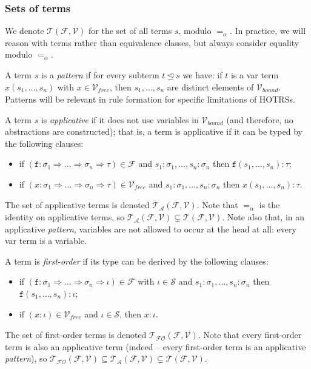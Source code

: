 \documentclass{lmcs}
\theoremstyle{theorem}\newtheorem{theorem}{Theorem}
\theoremstyle{theorem}\newtheorem{lemma}[theorem]{Lemma}
\theoremstyle{theorem}\newtheorem{corollary}[theorem]{Corollary}
\theoremstyle{definition}\newtheorem{definition}[theorem]{Definition}
\theoremstyle{definition}\newtheorem{example}[theorem]{Example}
\newcommand{\F}{\mathcal{F}}
\newcommand{\V}{\mathcal{V}}
\newcommand{\Vfree}{\mathcal{V}_{\mathit{free}}}
\newcommand{\Vbound}{\mathcal{V}_{\mathit{bound}}}
\newcommand{\Sorts}{\mathcal{S}}
\newcommand{\Terms}{\mathcal{T}}
\newcommand{\ATerms}{\mathcal{T}_{\mathcal{A}}}
\newcommand{\FOTerms}{\mathcal{T}_{\mathcal{FO}}}
\newcommand{\asort}{\iota}
\newcommand{\atype}{\sigma}
\newcommand{\btype}{\tau}
\newcommand{\identifier}[1]{\mathtt{#1}}
\newcommand{\afun}{\identifier{f}}
\newcommand{\avar}{x}
\newcommand{\arrtype}{\Rightarrow}
\newcommand{\subtermeq}{\unlhd}
\newcommand{\mysubsection}[1]{\vspace{-12pt}\subsubsection{#1}}
\begin{document}
\mysubsection{Sets of terms}

We denote $\Terms(\F,\V)$ for the set of all terms $s$, modulo $=_\alpha$.  In practice, we will
reason with terms rather than equivalence classes, but always consider equality modulo $=_\alpha$.

A term $s$ is a \emph{pattern} if for every subterm $t \subtermeq s$ we have: if $t$ is a var term
$x(s_1,\dots,s_n)$ with $x \in \Vfree$, then $s_1,\dots,s_n$ are distinct elements of $\Vbound$.
Patterns will be relevant in rule formation for specific limitations of HOTRSs.

A term $s$ is \emph{applicative} if it does not use variables in $\Vbound$ (and therefore, no
abstractions are constructed); that is, a term is applicative if it can be typed by the
following clauses:
\begin{itemize}
\item if $(\afun : \atype_1 \arrtype \dots \arrtype \atype_n \arrtype \btype) \in \F$ and
  $s_1 : \atype_1,\dots,s_n : \atype_n$ then $\afun(s_1,\dots,s_n) : \btype$;
\item if $(\avar : \atype_1 \arrtype \dots \arrtype \atype_n \arrtype \btype) \in \Vfree$ and
  $s_1 : \atype_1,\dots,s_n : \atype_n$ then $\avar(s_1,\dots,s_n) : \btype$.
\end{itemize}
The set of applicative terms is denoted $\ATerms(\F,\V)$.  Note that $=_\alpha$ is the
identity on applicative terms, so $\ATerms(\F,\V) \subsetneq \Terms(\F,\V)$.
Note also that, in an applicative \emph{pattern}, variables are not allowed to occur at the head
at all: every var term is a variable.

A term is \emph{first-order} if its type can be derived by the following clauses:
\begin{itemize}
\item if $(\afun : \atype_1 \arrtype \dots \arrtype \atype_n \arrtype \asort) \in \F$ with $\asort
  \in \Sorts$ and
  $s_1 : \atype_1,\dots,s_n : \atype_n$ then $\afun(s_1,\dots,s_n) : \asort$;
\item if $(\avar : \asort) \in \Vfree$ and $\asort \in \Sorts$, then $\avar : \asort$.
\end{itemize}
The set of first-order terms is denoted $\FOTerms(\F,\V)$.  Note that every first-order term is
also an applicative term (indeed -- every first-order term is an applicative \emph{pattern}),
so $\FOTerms(\F,\V) \subseteq \ATerms(\F,\V) \subsetneq \Terms(\F,\V)$.
\end{document}
